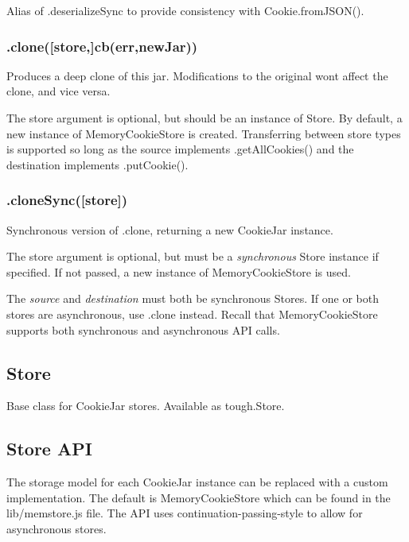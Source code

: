 Alias of {\ttfamily .deserialize\+Sync} to provide consistency with {\ttfamily Cookie.\+from\+J\+S\+O\+N()}.

\subsubsection*{{\ttfamily .clone(\mbox{[}store,\mbox{]}cb(err,new\+Jar))}}

Produces a deep clone of this jar. Modifications to the original won\textquotesingle{}t affect the clone, and vice versa.

The {\ttfamily store} argument is optional, but should be an instance of {\ttfamily Store}. By default, a new instance of {\ttfamily Memory\+Cookie\+Store} is created. Transferring between store types is supported so long as the source implements {\ttfamily .get\+All\+Cookies()} and the destination implements {\ttfamily .put\+Cookie()}.

\subsubsection*{{\ttfamily .clone\+Sync(\mbox{[}store\mbox{]})}}

Synchronous version of {\ttfamily .clone}, returning a new {\ttfamily Cookie\+Jar} instance.

The {\ttfamily store} argument is optional, but must be a {\itshape synchronous} {\ttfamily Store} instance if specified. If not passed, a new instance of {\ttfamily Memory\+Cookie\+Store} is used.

The {\itshape source} and {\itshape destination} must both be synchronous {\ttfamily Store}s. If one or both stores are asynchronous, use {\ttfamily .clone} instead. Recall that {\ttfamily Memory\+Cookie\+Store} supports both synchronous and asynchronous A\+PI calls.

\subsection*{Store}

Base class for Cookie\+Jar stores. Available as {\ttfamily tough.\+Store}.

\subsection*{Store A\+PI}

The storage model for each {\ttfamily Cookie\+Jar} instance can be replaced with a custom implementation. The default is {\ttfamily Memory\+Cookie\+Store} which can be found in the {\ttfamily lib/memstore.\+js} file. The A\+PI uses continuation-\/passing-\/style to allow for asynchronous stores.


